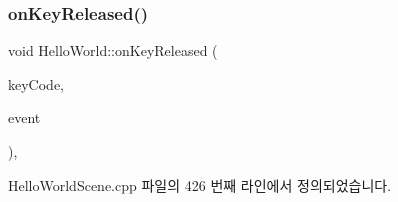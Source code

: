 \subsubsection{\texorpdfstring{on\+Key\+Released()}{onKeyReleased()}}
{\footnotesize\ttfamily void Hello\+World\+::on\+Key\+Released (\begin{DoxyParamCaption}\item[{\hyperlink{_hello_world_scene_8cpp_a29d93764040e709187aa17656a43405d}{cocos2d\+::\+Event\+Keyboard\+::\+Key\+Code}}]{key\+Code,  }\item[{cocos2d\+::\+Event $\ast$}]{event }\end{DoxyParamCaption})\hspace{0.3cm}{\ttfamily [protected]}, {\ttfamily [virtual]}}



Hello\+World\+Scene.\+cpp 파일의 426 번째 라인에서 정의되었습니다.


